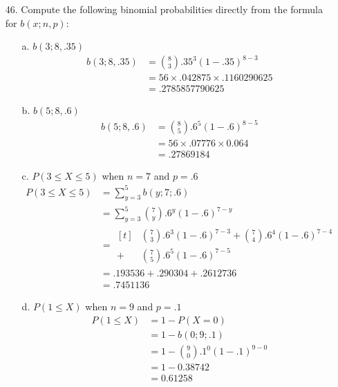 \documentclass[letterpaper,12pt]{article}
\newcommand{\bp}[3]{%
  \binom{#2}{#1}#3^#1(1 - #3)^{#2 - #1}%
}
\begin{document}
\maketitle

\begin{enumerate}
  \item[46.]
    Compute the following binomial probabilities directly from the formula for $b(x; n, p)$:
    \begin{enumerate}
      \item[a.]
        $b(3; 8, .35)$
        \begin{align*}
          b(3; 8, .35) &= \bp{3}{8}{.35} \\
          &= 56 \times .042875 \times .1160290625 \\
          &= .2785857790625
        \end{align*}
      \item[b.]
        $b(5; 8, .6)$
        \begin{align*}
          b(5; 8, .6) &= \bp{5}{8}{.6}  \\
          &= 56 \times .07776 \times 0.064 \\
          &= .27869184
        \end{align*}
      \item[c.]
        $P(3 \le X \le 5)$ when $n = 7$ and $p = .6$
        \begin{align*}
          P(3 \le X \le 5) &= \sum_{y = 3}^5 b(y; 7; .6) \\
          &= \sum_{y = 3}^5 \bp{y}{7}{.6}  \\
          &= \begin{aligned}[t]
              &\bp{3}{7}{.6} + \bp{4}{7}{.6}  \\
            + &\bp{5}{7}{.6}
          \end{aligned} \\
          &= .193536 + .290304 + .2612736 \\
          &= .7451136
        \end{align*}
      \item[d.]
        $P(1 \le X)$ when $n = 9$ and $p = .1$
        \begin{align*}
          P(1 \le X) &= 1 - P(X = 0) \\
          &= 1 - b(0; 9; .1) \\
          &= 1 - \bp{0}{9}{.1} \\
          &= 1 - 0.38742 \\
          &= 0.61258
        \end{align*}

\end{enumerate}
\end{enumerate}
\end{document}
